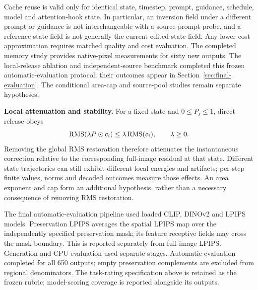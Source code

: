 Cache reuse is valid only for identical state, timestep, prompt, guidance, schedule, model and attention-hook state. In particular, an inversion field under a different prompt or guidance is not interchangeable with a source-prompt probe, and a reference-state field is not generally the current edited-state field. Any lower-cost approximation requires matched quality and cost evaluation. The completed memory study provides native-pixel measurements for sixty new outputs. The local-release ablation and independent-source benchmark completed this frozen automatic-evaluation protocol; their outcomes appear in Section~\ref{sec:final-evaluation}. The conditional area-cap and source-pool studies remain separate hypotheses.


\noindent\textbf{Local attenuation and stability.}
For a fixed state and $0\leq P_j\leq1$, direct release obeys
\begin{equation}
\operatorname{RMS}(\lambda P\odot c_i)\leq\lambda\operatorname{RMS}(c_i),\qquad\lambda\geq0.
\end{equation}
Removing the global RMS restoration therefore attenuates the instantaneous correction relative to the corresponding full-image residual at that state. Different state trajectories can still exhibit different local energies and artifacts; per-step finite values, norms and decoded outcomes measure those effects. An area exponent and cap form an additional hypothesis, rather than a necessary consequence of removing RMS restoration.

The final automatic-evaluation pipeline used loaded CLIP, DINOv2 and LPIPS models. Preservation LPIPS averages the spatial LPIPS map over the independently specified preservation mask; its feature receptive fields may cross the mask boundary. This is reported separately from full-image LPIPS. Generation and CPU evaluation used separate stages. Automatic evaluation completed for all 650 outputs; empty preservation complements are excluded from regional denominators. The task-rating specification above is retained as the frozen rubric; model-scoring coverage is reported alongside its outputs.
